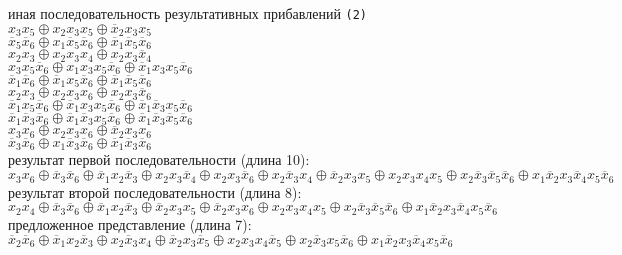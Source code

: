 \documentclass[a4paper,12pt,titlepage,finall]{article}
\begin{document}
иная последовательность результативных прибавлений \texttt{(2)}\\
$ x_3 x_5 \oplus x_2 x_3 x_5 \oplus \overline x_2 x_3 x_5 $ \\
$ \overline x_5 \overline x_6 \oplus x_1 \overline x_5 \overline x_6 \oplus \overline x_1 \overline x_5 \overline x_6 $ \\
$ x_2 x_3 \oplus x_2 x_3 x_4 \oplus x_2 x_3 \overline x_4 $ \\
$ x_3 x_5 \overline x_6 \oplus x_1 x_3 x_5 \overline x_6 \oplus \overline x_1 x_3 x_5 \overline x_6 $ \\
$ \overline x_1 \overline x_6 \oplus \overline x_1 x_5 \overline x_6 \oplus \overline x_1 \overline x_5 \overline x_6 $ \\
$ x_2 x_3 \oplus x_2 x_3 x_6 \oplus x_2 x_3 \overline x_6 $ \\
$ \overline x_1 x_5 \overline x_6 \oplus \overline x_1 x_3 x_5 \overline x_6 \oplus \overline x_1 \overline x_3 x_5 \overline x_6 $ \\
$ \overline x_1 \overline x_3 \overline x_6 \oplus \overline x_1 \overline x_3 x_5 \overline x_6 \oplus \overline x_1 \overline x_3 \overline x_5 \overline x_6 $ \\
$ x_3 x_6 \oplus x_2 x_3 x_6 \oplus \overline x_2 x_3 x_6 $ \\
$ \overline x_3 \overline x_6 \oplus x_1 \overline x_3 \overline x_6 \oplus \overline x_1 \overline x_3 \overline x_6 $ \\
результат первой последовательности (длина 10):\\
$ x_3 x_6 \oplus \overline x_3 \overline x_6 \oplus \overline x_1 x_2 \overline x_3 \oplus x_2 x_3 \overline x_4 \oplus x_2 x_3 \overline x_6 \oplus x_2 \overline x_3 x_4 \oplus \overline x_2 x_3 x_5 \oplus x_2 x_3 x_4 x_5 \oplus x_2 \overline x_3 \overline x_5 \overline x_6 \oplus x_1 \overline x_2 x_3 \overline x_4 x_5 \overline x_6 $ \\
результат второй последовательности (длина 8):\\
$ x_2 x_4 \oplus \overline x_3 \overline x_6 \oplus \overline x_1 x_2 \overline x_3 \oplus \overline x_2 x_3 x_5 \oplus \overline x_2 x_3 x_6 \oplus x_2 x_3 x_4 x_5 \oplus x_2 \overline x_3 \overline x_5 \overline x_6 \oplus x_1 \overline x_2 x_3 \overline x_4 x_5 \overline x_6 $ \\
предложенное представление (длина 7):\\
$ \overline x_2 \overline x_6 \oplus \overline x_1 x_2 \overline x_3 \oplus x_2 \overline x_3 x_4 \oplus \overline x_2 x_3 \overline x_5 \oplus x_2 x_3 x_4 \overline x_5 \oplus x_2 \overline x_3 x_5 \overline x_6 \oplus x_1 \overline x_2 x_3 \overline x_4 x_5 \overline x_6 $
\end{document}
